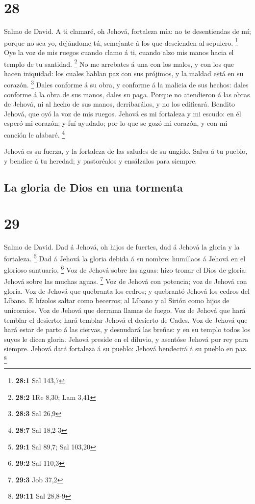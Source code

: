 \hypertarget{section-27}{%
\section{28}\label{section-27}}

 Salmo de David. A ti clamaré, oh Jehová, fortaleza mía: no
te desentiendas de mí; porque no sea yo, dejándome tú, semejante á los
que descienden al sepulcro. \footnote{\textbf{28:1} Sal 143,7}
 Oye la voz de mis ruegos cuando clamo á ti, cuando alzo mis
manos hacia el templo de tu santidad. \footnote{\textbf{28:2} 1Re 8,30;
  Lam 3,41}  No me arrebates á una con los malos, y con los
que hacen iniquidad: los cuales hablan paz con sus prójimos, y la maldad
está en su corazón. \footnote{\textbf{28:3} Sal 26,9}  Dales
conforme á su obra, y conforme á la malicia de sus hechos: dales
conforme á la obra de sus manos, dales su paga.  Porque no
atendieron á las obras de Jehová, ni al hecho de sus manos,
derribarálos, y no los edificará.  Bendito Jehová, que oyó
la voz de mis ruegos.  Jehová es mi fortaleza y mi escudo:
en él esperó mi corazón, y fuí ayudado; por lo que se gozó mi corazón, y
con mi canción le alabaré. \footnote{\textbf{28:7} Sal 18,2-3}

 Jehová es su fuerza, y la fortaleza de las saludes de su
ungido.  Salva á tu pueblo, y bendice á tu heredad; y
pastoréalos y ensálzalos para siempre.

\hypertarget{la-gloria-de-dios-en-una-tormenta}{%
\subsection{La gloria de Dios en una
tormenta}\label{la-gloria-de-dios-en-una-tormenta}}

\hypertarget{section-28}{%
\section{29}\label{section-28}}

 Salmo de David. Dad á Jehová, oh hijos de fuertes, dad á
Jehová la gloria y la fortaleza. \footnote{\textbf{29:1} Sal 89,7; Sal
  103,20}  Dad á Jehová la gloria debida á su nombre:
humillaos á Jehová en el glorioso santuario. \footnote{\textbf{29:2} Sal
  110,3}  Voz de Jehová sobre las aguas: hizo tronar el Dios
de gloria: Jehová sobre las muchas aguas. \footnote{\textbf{29:3} Job
  37,2}  Voz de Jehová con potencia; voz de Jehová con
gloria.  Voz de Jehová que quebranta los cedros; y quebrantó
Jehová los cedros del Líbano.  E hízolos saltar como
becerros; al Líbano y al Sirión como hijos de unicornios. 
Voz de Jehová que derrama llamas de fuego.  Voz de Jehová
que hará temblar el desierto; hará temblar Jehová el desierto de Cades.
 Voz de Jehová que hará estar de parto á las ciervas, y
desnudará las breñas: y en su templo todos los suyos le dicen gloria.
 Jehová preside en el diluvio, y asentóse Jehová por rey
para siempre.  Jehová dará fortaleza á su pueblo: Jehová
bendecirá á su pueblo en paz. \footnote{\textbf{29:11} Sal 28,8-9}

